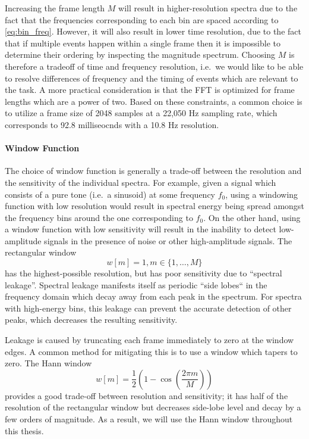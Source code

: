 Increasing the frame length $M$ will result in higher-resolution spectra due to the fact that the frequencies corresponding to each bin are spaced according to \cref{eq:bin_freq}.
However, it will also result in lower time resolution, due to the fact that if multiple events happen within a single frame then it is impossible to determine their ordering by inspecting the magnitude spectrum.
Choosing $M$ is therefore a tradeoff of time and frequency resolution, i.e.\ we would like to be able to resolve differences of frequency and the timing of events which are relevant to the task.
A more practical consideration is that the FFT is optimized for frame lengths which are a power of two.
Based on these constraints, a common choice is to utilize a frame size of 2048 samples at a 22,050 Hz sampling rate, which corresponds to 92.8 milliseocnds with a 10.8 Hz resolution.

\paragraph{Window Function}

The choice of window function is generally a trade-off between the resolution and the sensitivity of the individual spectra.
For example, given a signal which consists of a pure tone (i.e.\ a sinusoid) at some frequency $f_0$, using a windowing function with low resolution would result in spectral energy being spread amongst the frequency bins around the one corresponding to $f_0$.
On the other hand, using a window function with low sensitivity will result in the inability to detect low-amplitude signals in the presence of noise or other high-amplitude signals.
The rectangular window
\begin{equation}
        w[m] = 1, m \in \{1, \ldots, M\}
\end{equation}
has the highest-possible resolution, but has poor sensitivity due to ``spectral leakage''.
Spectral leakage manifests itself as periodic ``side lobes`` in the frequency domain which decay away from each peak in the spectrum.
For spectra with high-energy bins, this leakage can prevent the accurate detection of other peaks, which decreases the resulting sensitivity.

Leakage is caused by truncating each frame immediately to zero at the window edges.
A common method for mitigating this is to use a window which tapers to zero.
The Hann window
\begin{equation}
        w[m] = \frac{1}{2}\left(1 - \cos\left(\frac{2\pi m}{M}\right)\right)
\end{equation}
provides a good trade-off between resolution and sensitivity; it has half of the resolution of the rectangular window but decreases side-lobe level and decay by a few orders of magnitude.
As a result, we will use the Hann window throughout this thesis.

